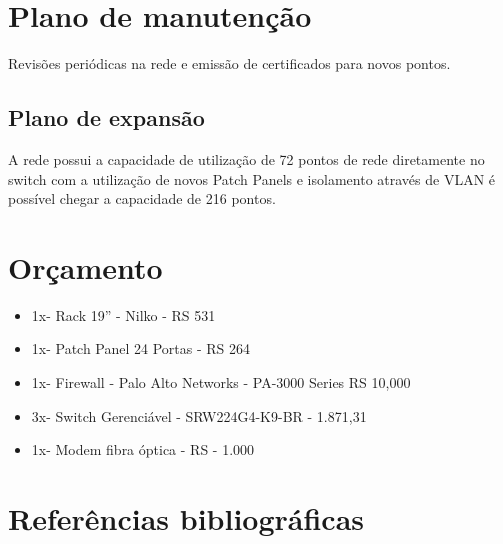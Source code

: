 \documentclass[	DIV=calc,%
							paper=a4,%
							fontsize=12pt,%
							onecolumn]{scrartcl}	 					%
\begin{document}
\section{Plano de manutenção}

Revisões periódicas na rede e emissão de certificados para novos pontos.

\subsection{Plano de expansão}

A rede possui a capacidade de utilização de 72 pontos de rede diretamente no switch com a utilização de novos Patch Panels e isolamento através de VLAN é possível chegar a capacidade de 216 pontos.


\section{Orçamento}
\begin{itemize}
\item 1x- Rack 19'' - Nilko - RS 531
\item 1x- Patch Panel 24 Portas - RS 264
\item 1x- Firewall - Palo Alto Networks - PA-3000 Series RS 10,000
\item 3x- Switch Gerenciável - SRW224G4-K9-BR - 1.871,31
\item 1x- Modem fibra óptica - RS - 1.000
\end{itemize}

\section{Referências bibliográficas}



\renewcommand\refname{} %

  
\end{document}
